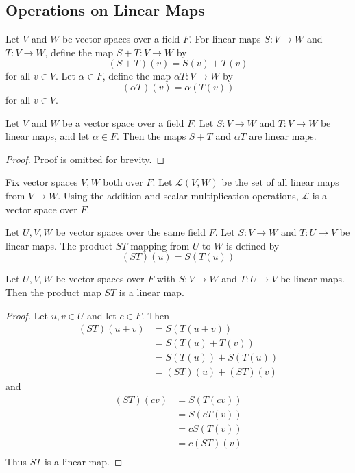 \documentclass{article}
\begin{document}
\subsection{Operations on Linear Maps}
\begin{definition}
  Let $V$ and $W$ be vector spaces over a field $F$. For linear maps $S: V \to W$ and $T: V \to W$, define the map $S + T: V \to W$ by \[
    (S+T)(v) = S(v) + T(v)
  \]
  for all $v \in V$. Let $\alpha \in F$, define the map $\alpha T : V \to W$ by \[
    (\alpha T)(v) = \alpha(T(v))
  \] for all $v \in V$.
\end{definition}
\begin{theorem}
  Let $V$ and $W$ be a vector space over a field $F$. Let $S: V \to W$ and $T: V \to W$ be linear maps, and let $\alpha \in F$. Then the maps $S + T$ and $\alpha T$ are linear maps.
\end{theorem}
\begin{proof}
  Proof is omitted for brevity.
\end{proof}
\begin{theorem}
  Fix vector spaces $V, W$ both over $F$. Let $\mathcal{L}(V, W)$ be the set of all linear maps from $V \to W$. Using the addition and scalar multiplication operations, $\mathcal{L}$ is a vector space over $F$.
\end{theorem}
\begin{definition}
  Let $U, V, W$ be vector spaces over the same field $F$. Let $S: V \to W$ and $T: U \to V$ be linear maps. The product $ST$ mapping from $U$ to $W$ is defined by \[
    (ST)(u) = S(T(u))
  \]
\end{definition}
\begin{theorem}
  Let $U, V, W$ be vector spaces over $F$ with $S: V \to W$ and $T: U \to V$ be linear maps. Then the product map $ST$ is a linear map.
\end{theorem}
\begin{proof}
  Let $u, v \in U$ and let $c \in F$. Then
  \begin{align*}
    (ST)(u+v) &= S(T(u+v))\\
    &= S(T(u) + T(v))\\
    &= S(T(u)) + S(T(u))\\
    &= (ST)(u) + (ST)(v)
  \end{align*} and
  \begin{align*}
    (ST)(cv) &= S(T(cv))\\
    &= S(cT(v))\\
    &= cS(T(v))\\
    &= c(ST)(v)\\
  \end{align*}
  Thus $ST$ is a linear map.
\end{proof}
\end{document}

